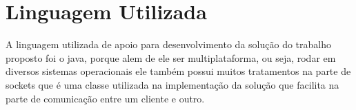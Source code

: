 \documentclass{abnt}
\begin{document}
	
	\section{Linguagem Utilizada}	
		A linguagem utilizada de apoio para desenvolvimento da solução do trabalho proposto foi o java, porque alem de ele ser multiplataforma, ou seja, rodar em diversos sistemas operacionais ele também possui muitos tratamentos na parte de sockets que é uma classe utilizada na implementação da solução que facilita na parte de comunicação entre um cliente e outro. \cite{ORACLE}
		
	



\clearpage
\nocite{*}
		
	
	
\end{document}
